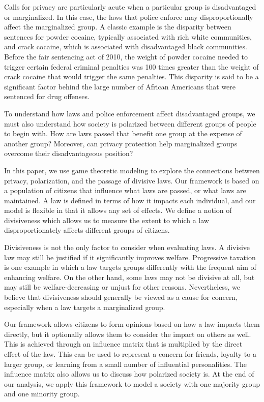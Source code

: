 Calls for privacy are particularly acute when a particular group is disadvantaged or marginalized.  In this case, the laws that police enforce may disproportionally affect the marginalized group.  A classic example is the disparity between sentences for powder cocaine, typically associated with rich white communities, and crack cocaine, which is associated with disadvantaged black communities.  Before the fair sentencing act of 2010, the weight of powder cocaine needed to trigger certain federal criminal penalties was 100 times greater than the weight of crack cocaine that would trigger the same penalties.  This disparity is said to be a significant factor behind the large number of African Americans that were sentenced for drug offenses.~\cite{beaver2009getting}

To understand how laws and police enforcement affect disadvantaged groups, we must also understand how society is polarized between different groups of people to begin with.  How are laws passed that benefit one group at the expense of another group?  Moreover, can privacy protection help marginalized groups overcome their disadvantageous position?

In this paper, we use game theoretic modeling to explore the connections between privacy, polarization, and the passage of divisive laws.  Our framework is based on a population of citizens that influence what laws are passed, or what laws are maintained.  A law is defined in terms of how it impacts each individual, and our model is flexible in that it allows any set of effects.  We define a notion of divisiveness which allows us to measure the extent to which a law disproportionately affects different groups of citizens.

Divisiveness is not the only factor to consider when evaluating laws.  A divisive law may still be justified if it significantly improves welfare.  Progressive taxation is one example in which a law targets groups differently with the frequent aim of enhancing welfare.  On the other hand, some laws may not be divisive at all, but may still be welfare-decreasing or unjust for other reasons.  Nevertheless, we believe that divisiveness should generally be viewed as a cause for concern, especially when a law targets a marginalized group.

Our framework allows citizens to form opinions based on how a law impacts them directly, but it optionally allows them to consider the impact on others as well.  This is achieved through an influence matrix that is multiplied by the direct effect of the law.  This can be used to represent a concern for friends, loyalty to a larger group, or learning from a small number of influential personalities.  The influence matrix also allows us to discuss how polarized society is.  At the end of our analysis, we apply this framework to model a society with one majority group and one minority group.

